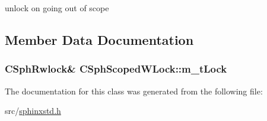 unlock on going out of scope 



\subsection{Member Data Documentation}
\hypertarget{classCSphScopedWLock_a9571c0a3852d1f6e49f644fab74c17b8}{
\subsubsection[{m\-\_\-t\-Lock}]{\setlength{\rightskip}{0pt plus 5cm}C\-Sph\-Rwlock\& C\-Sph\-Scoped\-W\-Lock\-::m\-\_\-t\-Lock\hspace{0.3cm}{\ttfamily [protected]}}}\label{classCSphScopedWLock_a9571c0a3852d1f6e49f644fab74c17b8}


The documentation for this class was generated from the following file\-:\begin{DoxyCompactItemize}
\item 
src/\hyperlink{sphinxstd_8h}{sphinxstd.\-h}\end{DoxyCompactItemize}
